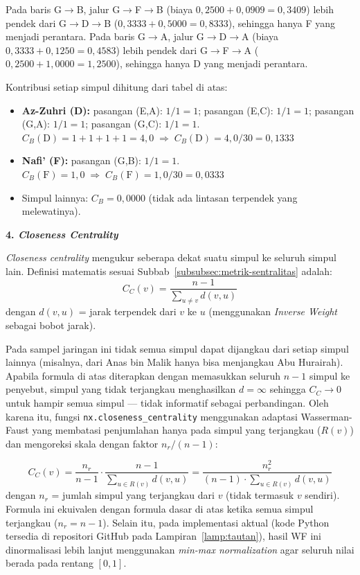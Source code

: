 \noindent Pada baris G$\to$B, jalur G$\to$F$\to$B (biaya $0{,}2500 + 0{,}0909 = 0{,}3409$) lebih pendek dari G$\to$D$\to$B ($0{,}3333 + 0{,}5000 = 0{,}8333$), sehingga hanya F yang menjadi perantara. Pada baris G$\to$A, jalur G$\to$D$\to$A (biaya $0{,}3333 + 0{,}1250 = 0{,}4583$) lebih pendek dari G$\to$F$\to$A ($0{,}2500 + 1{,}0000 = 1{,}2500$), sehingga hanya D yang menjadi perantara.

\noindent Kontribusi setiap simpul dihitung dari tabel di atas:
\begin{itemize}
    \item \textbf{Az-Zuhri (D):} pasangan (E,A): $1/1 = 1$; pasangan (E,C): $1/1 = 1$; pasangan (G,A): $1/1 = 1$; pasangan (G,C): $1/1 = 1$. \\
          $C_B(\text{D}) = 1 + 1 + 1 + 1 = 4{,}0 \;\Rightarrow\; C_B(\text{D}) = 4{,}0 / 30 = 0{,}1333$
    \item \textbf{Nafi' (F):} pasangan (G,B): $1/1 = 1$. \\
          $C_B(\text{F}) = 1{,}0 \;\Rightarrow\; C_B(\text{F}) = 1{,}0 / 30 = 0{,}0333$
    \item Simpul lainnya: $C_B = 0{,}0000$ (tidak ada lintasan terpendek yang melewatinya).
\end{itemize}

\vspace{0.3cm}
\noindent\textbf{4. \textit{Closeness Centrality}}

\vspace{0.2cm}
\noindent \textit{Closeness centrality} mengukur seberapa dekat suatu simpul ke seluruh simpul lain. Definisi matematis sesuai Subbab~\ref{subsubsec:metrik-sentralitas} adalah:
$$C_C(v) = \frac{n-1}{\displaystyle\sum_{u \neq v} d(v,u)}$$
dengan $d(v,u)$ = jarak terpendek dari $v$ ke $u$ (menggunakan \textit{Inverse Weight} sebagai bobot jarak).

\begin{sloppypar}
\noindent Pada sampel jaringan ini tidak semua simpul dapat dijangkau dari setiap simpul lainnya (misalnya, dari Anas bin Malik hanya bisa menjangkau Abu Hurairah). Apabila formula di atas diterapkan dengan memasukkan seluruh $n-1$ simpul ke penyebut, simpul yang tidak terjangkau menghasilkan $d = \infty$ sehingga $C_C \to 0$ untuk hampir semua simpul --- tidak informatif sebagai perbandingan. Oleh karena itu, fungsi \texttt{nx.closeness\_centrality} menggunakan adaptasi Wasserman-Faust yang membatasi penjumlahan hanya pada simpul yang terjangkau ($R(v)$) dan mengoreksi skala dengan faktor $n_r/(n-1)$:
\end{sloppypar}
$$C_C(v) = \frac{n_r}{n-1} \cdot \frac{n-1}{\displaystyle\sum_{u \in R(v)} d(v,u)} = \frac{n_r^2}{(n-1) \cdot \displaystyle\sum_{u \in R(v)} d(v,u)}$$
dengan $n_r$ = jumlah simpul yang terjangkau dari $v$ (tidak termasuk $v$ sendiri). Formula ini ekuivalen dengan formula dasar di atas ketika semua simpul terjangkau ($n_r = n-1$). Selain itu, pada implementasi aktual (kode Python tersedia di repositori GitHub pada Lampiran~\ref{lamp:tautan}), hasil WF ini dinormalisasi lebih lanjut menggunakan \textit{min-max normalization} agar seluruh nilai berada pada rentang $[0, 1]$.

